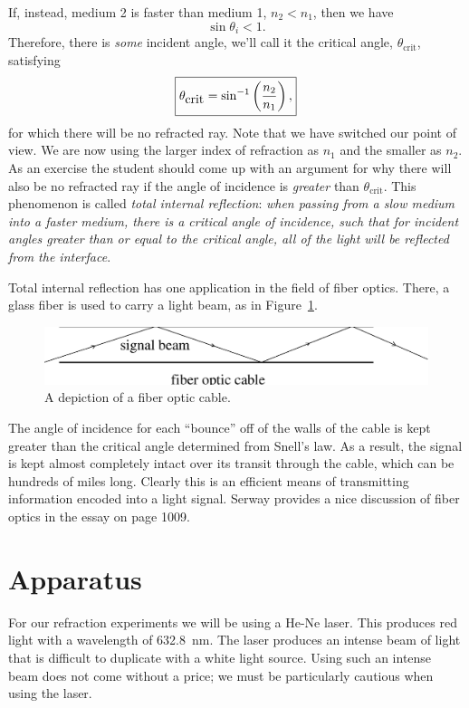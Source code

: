 If, instead, medium 2 is faster than medium 1, $n_2<n_1$, then we have
$$
\sin\theta_i <1.
$$ 
Therefore, there is {\it some} incident angle, we'll call it the critical 
angle, $\theta_{\mbox{crit}}$, satisfying
\begin{equation}
\fbox{$ \displaystyle \theta_{\mbox{crit}}=\sin^{-1}\left(\frac{n_2}{n_1}\right), $}
\label{eq:opt:totintref}
\end{equation}  
for which there will be no refracted ray. Note that
we have switched our point of view.  We are now using the larger index
of refraction as $n_1$ and the smaller as $n_2$.
As an exercise the student should
come up with an argument for why there will also be no refracted ray if the 
angle of incidence is {\it greater} than $\theta_{\mbox{crit}}$. This 
phenomenon is called {\it total internal reflection}: {\it when passing from a 
slow medium into a faster medium, there is a critical angle of incidence, such 
that for incident angles greater than or equal to the critical angle, all of 
the light will be reflected from the interface}.

Total internal reflection has one application in the field of fiber optics.
There, a glass fiber is used to carry a light beam, as in 
Figure~\ref{fig:opt:fiber}.
\begin{figure}[htb]
\centering 
\epsfxsize=12cm \includegraphics[scale=0.6]{8_optics/fibopt.eps}
\caption{A depiction of a fiber optic cable.}
\label{fig:opt:fiber}
\end{figure}
The angle of incidence for each ``bounce'' off of the walls of the cable is
kept greater than the critical angle determined from Snell's law. As a result,
the signal is kept almost completely intact over its transit through the cable,
which can be hundreds of miles long.  Clearly this is an efficient means of
transmitting information encoded into a light signal. Serway provides a nice
discussion of fiber optics in the essay on page 1009.


\section{Apparatus}

For our refraction experiments we will be using a He-Ne laser.  This produces
red light with a wavelength of 632.8~nm.  The laser produces an intense
beam of light that is difficult to duplicate with a white light source.  Using
such an intense beam does not come without a price; we must be particularly 
cautious when using the laser.


